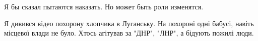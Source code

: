 \begin{itemize}
 
Я бы сказал пытаются наказать. Но может быть роли изменятся.

 

Я дивився відео похорону хлопчика в Луганську. На похороні одні бабусі, навіть
місцевої влади не було. Хтось агітував за "ДНР", "ЛНР", а бідують пожилі люди.

\end{itemize}


